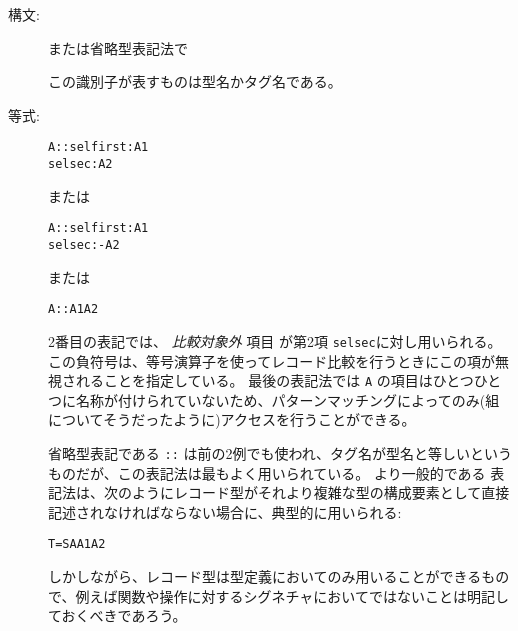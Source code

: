 \documentclass[\pformat,12pt]{jarticle}
\begin{document}
\begin{description}
\item[構文:] 
  
  
  
  
  または省略型表記法で
  
  
  この識別子が表すものは型名かタグ名である。

\item[等式:]
\mbox{}\label{a-type}
  \begin{alltt}
    A :: selfirst : A1
         selsec   : A2
  \end{alltt}%
\index{\texttt{::}}

	または

  \begin{alltt}
    A :: selfirst :  A1
         selsec   :- A2
  \end{alltt}%
\index{\texttt{:-}}

	または

  \begin{alltt}
    A :: A1 A2
  \end{alltt}

  2番目の表記では、 {\it 比較対象外\/} 項目
   が第2項 {\tt selsec}に対し用いられる。
この負符号は、等号演算子を使ってレコード比較を行うときにこの項が無視されることを指定している。
最後の表記法では {\tt A} の項目はひとつひとつに名称が付けられていないため、パターンマッチングによってのみ(組についてそうだったように)アクセスを行うことができる。
  
省略型表記である {\tt ::} は前の2例でも使われ、タグ名が型名と等しいというものだが、この表記法は最もよく用いられている。
 より一般的である  表記法は、次のようにレコード型がそれより複雑な型の構成要素として直接記述されなければならない場合に、典型的に用いられる:

  \begin{alltt}
    T =  S  A  A1 A2 
  \end{alltt}
しかしながら、レコード型は型定義においてのみ用いることができるもので、例えば関数や操作に対するシグネチャにおいてではないことは明記しておくべきであろう。


\end{description}
\end{document}
